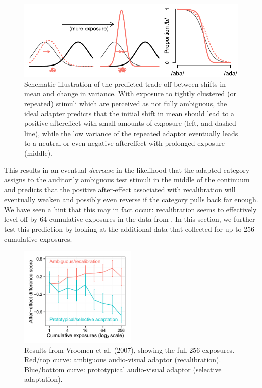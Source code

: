 \begin{figure}[htb]
  \centering
  \includegraphics[width=\textwidth]{schematic-recal.pdf}
  \caption{Schematic illustration of the predicted trade-off between shifts in mean and change in variance.  With exposure to tightly clustered (or repeated) stimuli which are perceived as not fully ambiguous, the ideal adapter predicts that the initial shift in mean should lead to a positive aftereffect with small amounts of exposure (left, and dashed line), while the low variance of the repeated adaptor eventually leads to a neutral or even negative aftereffect with prolonged exposure (middle).}
  \label{fig:mcgurk-preds-schematic}
\end{figure}

This results in an eventual \emph{decrease} in the likelihood that the adapted category assigns to the auditorily ambiguous test stimuli in the middle of the continuum and predicts that the positive after-effect associated with recalibration will eventually weaken and possibly even reverse if the category pulls back far enough.  We have seen a hint that this may in fact occur: recalibration seems to effectively level off by 64 cumulative exposures in the data from .  In this section, we further test this prediction by looking at the additional data that  collected for up to 256 cumulative exposures.


\begin{figure}[htb]
  \centering
  \includegraphics[width=0.5\textwidth]{vroomen-ae-first.pdf}
  \caption{Results from Vroomen et al. (2007), showing the full 256 exposures.  Red/top curve: ambiguous audio-visual adaptor (recalibration).  Blue/bottom curve: prototypical audio-visual adaptor (selective adaptation).}
  \label{fig:vroomen-results-256}
\end{figure}

